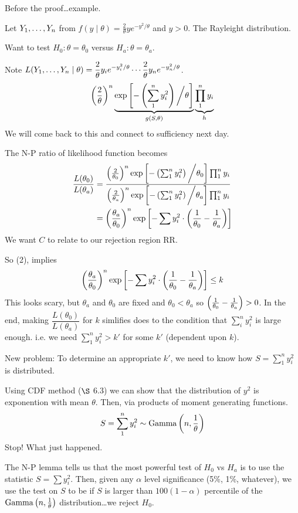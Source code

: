 \nl Before the proof\dots example.

\example Let ${Y}_1, \dots, {Y}_n$ from $\displaystyle f(y \mid \theta) = \frac{2}{\theta}y e^{-y^2/\theta}$ and $y > 0$. The Rayleight distribution.

\nl Want to test  $H_0 : \theta = \theta_0$ versus $H_a : \theta = \theta_a$.

\nl Note $\displaystyle L({Y}_1, \dots, {Y}_n \mid \theta) = \frac{2}{\theta} y_i e^{-y_i^2/\theta} \cdots \frac{2}{\theta} y_n e^{-y_n^2/\theta}$.
$$\pars{\frac{2}{\theta}}^n \underbrace{\exp \brac{- \pars{\sum_1^n y_i^2} \bigg/ \theta }}_{g(S,\theta)} \underbrace{\prod_1^n y_i}_{h}$$
We will come back to this and connect to sufficiency next day.

The N-P ratio of likelihood function becomes
\begin{align*}
    \dfrac{L(\theta_0)}{L(\theta_a)} &= 
    \frac
    {\pars{\frac{2}{\theta_0}}^n \exp \brac{- \pars{\sum_1^n y_i^2} \bigg/ \theta_0 }\prod_1^n y_i}
    {\pars{\frac{2}{\theta_a}}^n \exp \brac{- \pars{\sum_1^n y_i^2} \bigg/ \theta_a }\prod_1^n y_i}\\
    &= \pars{\frac{\theta_a}{\theta_0}}^n \exp \brac{-\sum y_i^2 \cdot \pars{\over{\theta_0} - \over{\theta_a}}}
\end{align*}
We want $C$ to relate to our rejection region RR.

\nl So (2), implies 
$$\pars{\frac{\theta_a}{\theta_0}}^n \exp \brac{-\sum y_i^2 \cdot \pars{\over{\theta_0} - \over{\theta_a}}} \leq k$$
This looks scary, but $\theta_a$ and $\theta_0$ are fixed and $\theta_0 < \theta_a$ so $\pars{\over{\theta_0} - \over{\theta_a}} > 0$. In the end, making $\dfrac{L(\theta_0)}{L(\theta_a)}$  for $k$ simlifies does to the condition that $\sum_{i}^n y_i^2$ is large enough. i.e. we need $\sum_1^n y_i^2 > k'$ for some $k'$ (dependent upon $k$). 

\nl New problem: To determine an appropriate $k'$, we need to know how $S = \sum_1^n y_i^2$ is distributed. 

\nl Using CDF method ($\S$ 6.3) we can show that the distribution of $y^2$ is exponention with mean $\theta$. Then, via products of moment generating functions. $$S = \sum_1^n y_i^2 \sim \operatorname{Gamma}\pars{n, \over{\theta}}$$
Stop! What just happened. 

\nl The N-P lemma tells us that the most powerful test of $H_0$ vs $H_a$ is to use the statistic $S = \sum y_i^2$. Then, given any $\alpha$ level significance (5\%, 1\%, whatever), we use the test on $S$ to be if $S$ is larger than $100(1-\alpha)$ percentile of the $\operatorname{Gamma}\pars{n, \over{\theta}}$ distribution\dots we reject $H_0$. 

